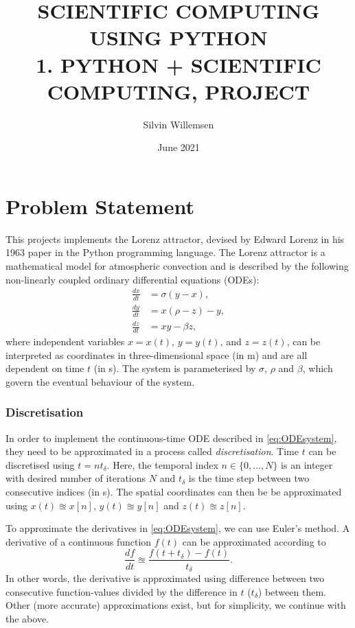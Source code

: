 \documentclass{article}
\title{SCIENTIFIC COMPUTING USING PYTHON\\
1. PYTHON + SCIENTIFIC COMPUTING, PROJECT
}
\author{Silvin Willemsen}
\date{June 2021}
\def\td{t_\delta}
\begin{document}
\maketitle

\section{Problem Statement}\label{sec:problemStatement}
This projects implements the Lorenz attractor, devised by Edward Lorenz in his 1963 paper \cite{lorenz} in the Python programming language. The Lorenz attractor is a mathematical model for atmospheric convection and is described by the following non-linearly coupled ordinary differential equations (ODEs):
\begin{subequations}\label{eq:ODEsystem}
    \begin{align}
        \frac{dx}{dt} &= \sigma(y-x),\\
        \frac{dy}{dt} &= x(\rho - z) - y,\\
        \frac{dz}{dt} &= xy - \beta z,
    \end{align}
\end{subequations}
where independent variables $x = x(t)$, $y = y(t)$, and $z = z(t)$, can be interpreted as coordinates in three-dimensional space (in m) and are all dependent on time $t$ (in s). The system is parameterised by $\sigma$, $\rho$ and $\beta$, which govern the eventual behaviour of the system.

\subsubsection*{Discretisation}
In order to implement the continuous-time ODE described in \eqref{eq:ODEsystem}, they need to be approximated in a process called \textit{discretisation}. Time $t$ can be discretised using $t = n \td $. Here, the temporal index $n\in \{0, \hdots, N\}$ is an integer with desired number of iterations $N$ and $\td$ is the time step between two consecutive indices (in s). The spatial coordinates can then be be approximated using $x(t)\approxeq x[n]$, $y(t)\approxeq y[n]$ and $z(t)\approxeq z[n]$. 

To approximate the derivatives in \eqref{eq:ODEsystem}, we can use Euler's method. A derivative of a continuous function $f(t)$ can be approximated according to
\begin{equation}\label{eq:euler}
    \frac{df}{dt} \approxeq \frac{f(t+\td) - f(t)}{\td}.
\end{equation}
In other words, the derivative is approximated using difference between two consecutive function-values divided by the difference in $t$ ($\td$) between them. Other (more accurate) approximations exist, but for simplicity, we continue with the above.
\end{document}
